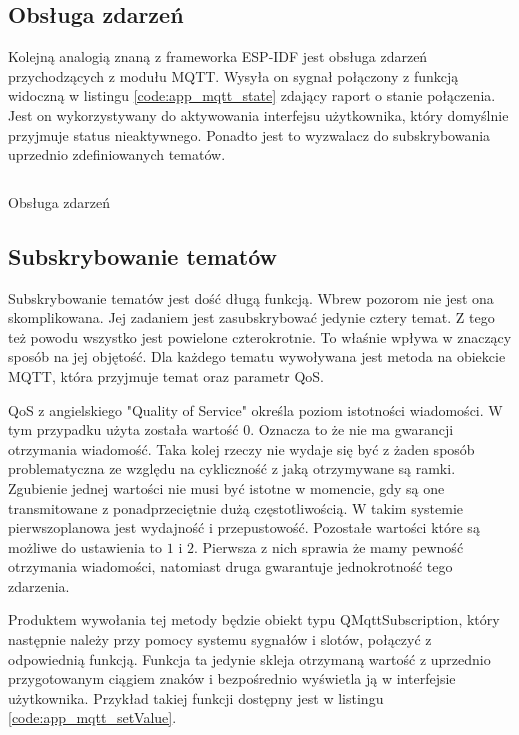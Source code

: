       \subsection{Obsługa zdarzeń}
        Kolejną analogią znaną z frameworka ESP-IDF jest obsługa zdarzeń przychodzących z modułu MQTT. Wysyła on sygnał połączony z funkcją widoczną w listingu \ref{code:app_mqtt_state} zdający raport o stanie połączenia. Jest on wykorzystywany do aktywowania interfejsu użytkownika, który domyślnie przyjmuje status nieaktywnego. Ponadto jest to wyzwalacz do subskrybowania uprzednio zdefiniowanych tematów.
        \begin{kod}
          \inputminted[firstline=102, lastline=127]{cpp}{app/listings/mainwindow.cpp}
          \caption{Obsługa zdarzeń}
          \label{code:app_mqtt_state}
        \end{kod}
        
        
      \subsection{Subskrybowanie tematów}
        Subskrybowanie tematów jest dość długą funkcją. Wbrew pozorom nie jest ona skomplikowana. Jej zadaniem jest zasubskrybować jedynie cztery temat. Z tego też powodu wszystko jest powielone czterokrotnie. To właśnie wpływa w znaczący sposób na jej objętość. Dla każdego tematu wywoływana jest metoda na obiekcie MQTT, która przyjmuje temat oraz parametr QoS. 
        
        QoS z angielskiego "Quality of Service" określa poziom istotności wiadomości. W tym przypadku użyta została wartość $0$. Oznacza to że nie ma gwarancji otrzymania wiadomość. Taka kolej rzeczy nie wydaje się być z żaden sposób problematyczna ze względu na cykliczność z jaką otrzymywane są ramki. Zgubienie jednej wartości nie musi być istotne w momencie, gdy są one transmitowane z ponadprzeciętnie dużą częstotliwością. W takim systemie pierwszoplanowa jest wydajność i przepustowość. Pozostałe wartości które są możliwe do ustawienia to $1$ i $2$. Pierwsza z nich sprawia że mamy pewność otrzymania wiadomości, natomiast druga gwarantuje jednokrotność tego zdarzenia.
        
        Produktem wywołania tej metody będzie obiekt typu QMqttSubscription, który następnie należy przy pomocy systemu sygnałów i slotów, połączyć z odpowiednią funkcją. Funkcja ta jedynie skleja otrzymaną wartość z uprzednio przygotowanym ciągiem znaków i bezpośrednio wyświetla ją w interfejsie użytkownika. Przykład takiej funkcji dostępny jest w listingu \ref{code:app_mqtt_setValue}. 
        
